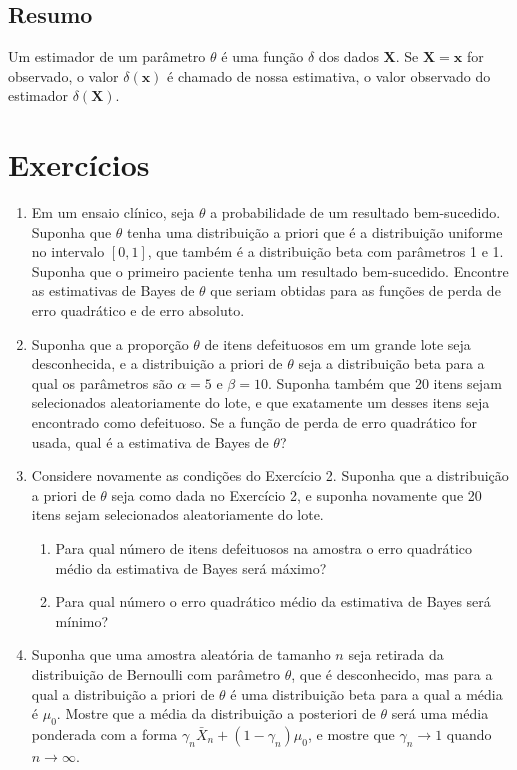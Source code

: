 \subsection*{Resumo}
Um estimador de um parâmetro $\theta$ é uma função $\delta$ dos dados $\mathbf{X}$. Se $\mathbf{X}=\mathbf{x}$ for observado, o valor $\delta(\mathbf{x})$ é chamado de nossa estimativa, o valor observado do estimador $\delta(\mathbf{X})$.

\section*{Exercícios}
\begin{enumerate}
    \item Em um ensaio clínico, seja $\theta$ a probabilidade de um resultado bem-sucedido. Suponha que $\theta$ tenha uma distribuição a priori que é a distribuição uniforme no intervalo $[0, 1]$, que também é a distribuição beta com parâmetros 1 e 1. Suponha que o primeiro paciente tenha um resultado bem-sucedido. Encontre as estimativas de Bayes de $\theta$ que seriam obtidas para as funções de perda de erro quadrático e de erro absoluto.
    
    \item Suponha que a proporção $\theta$ de itens defeituosos em um grande lote seja desconhecida, e a distribuição a priori de $\theta$ seja a distribuição beta para a qual os parâmetros são $\alpha=5$ e $\beta=10$. Suponha também que 20 itens sejam selecionados aleatoriamente do lote, e que exatamente um desses itens seja encontrado como defeituoso. Se a função de perda de erro quadrático for usada, qual é a estimativa de Bayes de $\theta$?
    
    \item Considere novamente as condições do Exercício 2. Suponha que a distribuição a priori de $\theta$ seja como dada no Exercício 2, e suponha novamente que 20 itens sejam selecionados aleatoriamente do lote.
    \begin{enumerate}[label=(\alph*)]
        \item Para qual número de itens defeituosos na amostra o erro quadrático médio da estimativa de Bayes será máximo?
        \item Para qual número o erro quadrático médio da estimativa de Bayes será mínimo?
    \end{enumerate}
    
    \item Suponha que uma amostra aleatória de tamanho $n$ seja retirada da distribuição de Bernoulli com parâmetro $\theta$, que é desconhecido, mas para a qual a distribuição a priori de $\theta$ é uma distribuição beta para a qual a média é $\mu_0$. Mostre que a média da distribuição a posteriori de $\theta$ será uma média ponderada com a forma $\gamma_n \bar{X}_n + (1-\gamma_n)\mu_0$, e mostre que $\gamma_n \to 1$ quando $n \to \infty$.
    

\end{enumerate}
